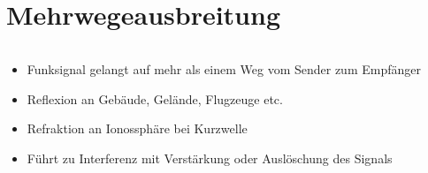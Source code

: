 
\section{Mehrwegeausbreitung}
\label{section:mehrwegeausbreitung}
\begin{frame}%

\begin{columns}
    \begin{column}{0.48\textwidth}
    \begin{itemize}
  \item Funksignal gelangt auf mehr als einem Weg vom Sender zum Empfänger
  \item Reflexion an Gebäude, Gelände, Flugzeuge etc.
  \item Refraktion an Ionossphäre bei Kurzwelle
  \item Führt zu Interferenz mit Verstärkung oder Auslöschung des Signals
  \end{itemize}

    \end{column}
   \begin{column}{0.48\textwidth}
       
   \end{column}
\end{columns}

\end{frame}

\begin{frame}\end{frame}%
